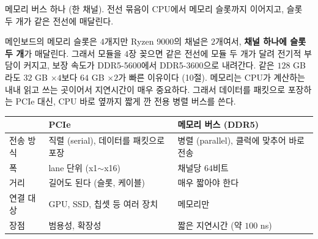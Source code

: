\documentclass[11pt,a4paper]{article}
\begin{document}
\begin{center}
\begin{minipage}{\textwidth}\centering
{}

\small 메모리 버스 하나 (한 채널). 전선 묶음이 CPU에서 메모리 슬롯까지 이어지고, 슬롯 두 개가 같은 전선에 매달린다.
\end{minipage}
\end{center}

메인보드의 메모리 슬롯은 $4$개지만 Ryzen 9000의 채널은 $2$개여서, \textbf{채널 하나에 슬롯 두 개}가 매달린다.
그래서 모듈을 $4$장 꽂으면 같은 전선에 모듈 두 개가 달려 전기적 부담이 커지고, 보장 속도가 DDR5-5600에서 DDR5-3600으로 내려간다.
같은 $128$ GB라도 $32$ GB $\times4$보다 $64$ GB $\times2$가 빠른 이유이다 (10절).
메모리는 CPU가 계산하는 내내 읽고 쓰는 곳이어서 지연시간이 매우 중요하다.
그래서 데이터를 패킷으로 포장하는 PCIe 대신, CPU 바로 옆까지 짧게 깐 전용 병렬 버스를 쓴다.

\begin{center}
{\small
\begin{tabular}{@{}lll@{}}
\toprule
& PCIe & 메모리 버스 (DDR5) \\
\midrule
전송 방식 & 직렬 (serial), 데이터를 패킷으로 포장 & 병렬 (parallel), 클럭에 맞추어 바로 전송 \\
폭 & lane 단위 (x1$\sim$x16) & 채널당 $64$비트 \\
거리 & 길어도 된다 (슬롯, 케이블) & 매우 짧아야 한다 \\
연결 대상 & GPU, SSD, 칩셋 등 여러 장치 & 메모리만 \\
장점 & 범용성, 확장성 & 짧은 지연시간 (약 $100$ ns) \\
\bottomrule
\end{tabular}}
\end{center}
\end{document}
